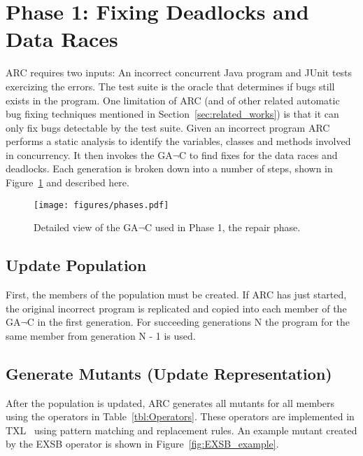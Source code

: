 \documentclass[runningheads,a4paper]{llncs}
\begin{document}
\section{Phase 1: Fixing Deadlocks and Data Races}
\label{sec:Phase1Functional}

ARC requires two inputs: An incorrect concurrent Java program and JUnit tests exercizing the errors. The test suite is the oracle that determines if bugs still exists in the program. One limitation of ARC (and of other related automatic bug fixing techniques mentioned in Section~\ref{sec:related_works}) is that it can only fix bugs detectable by the test suite. Given an incorrect program ARC performs a static analysis to identify the variables, classes and methods involved in concurrency.  It then invokes the GA$\neg$C to find fixes for the data races and deadlocks.  Each generation is broken down into a number of steps, shown in Figure~\ref{fig:Phase1GAnotC} and described here.

\begin{figure}[t!]
  \centering
  \texttt{[image: figures/phases.pdf]}
  \caption{Detailed view of the GA$\neg$C used in Phase 1, the repair phase.}
  \label{fig:Phase1GAnotC}
\end{figure}

\subsection{Update Population}
\label{sec:UpdatePopulation}

First, the members of the population must be created.  If ARC has just started, the original incorrect program is replicated and copied into each member of the GA$\neg$C in the first generation.  For succeeding generations N the program for the same member from generation N - 1 is used. %

\subsection{Generate Mutants (Update Representation)}
\label{sec:GenerateMutants}

After the population is updated, ARC generates all mutants for all members using the operators in Table~\ref{tbl:Operators}.
These operators are implemented in  TXL~\cite{CHP91} using pattern matching and replacement rules. An example mutant created by the EXSB operator is shown in Figure~\ref{fig:EXSB_example}. 
\end{document}
